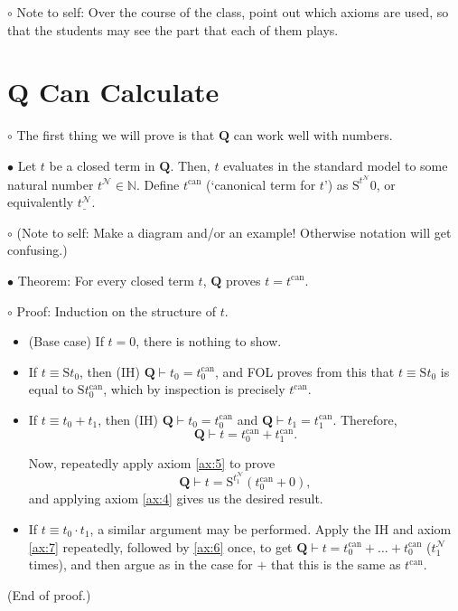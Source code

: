 \documentclass{article}
\newcommand{\N}{\mathbb{N}}
\newcommand{\RQ}{\mathbf{Q}}
\newcommand{\TN}{\mathcal{N}}
\newcommand{\suc}{\mathrm{S}}
\newcommand{\can}{\mathrm{can}}
\newcommand\Point[1]{\noindent \hspace{\labelsep} {\large $\bullet$ #1} \smallskip}
\newcommand\point[1]{\noindent \hspace{\labelsep} {\small $\circ$ #1} \smallskip}
\newcommand\timestamp[1]{}
\newcommand\proofend{\hfill(End of proof.)}
\begin{document}
\point{Note to self: Over the course of the class, point out which axioms are used, so that the students may see the part that each of them plays.}

\timestamp{5 min}

\section{$\RQ$ Can Calculate}

\point{The first thing we will prove is that $\RQ$ can work well with numbers.}

\Point{Let $t$ be a closed term in $\RQ$. Then, $t$ evaluates in the standard model to some natural number $t^\TN \in \N$. Define $t^\can$ (`canonical term for $t$') as $\suc^{t^\TN}0$, or equivalently $\underline{t^\TN}$.}

\point{(Note to self: Make a diagram and/or an example! Otherwise notation will get confusing.)}

\Point{Theorem: For every closed term $t$, $\RQ$ proves $t = t^\can$.}

\point{Proof: Induction on the structure of $t$.
\begin{itemize}
\item (Base case) If $t = 0$, there is nothing to show.
\item If $t \equiv \suc t_0$, then (IH) $\RQ \vdash t_0 = t_0^\can$, and FOL proves from this that $t \equiv \suc t_0$ is equal to $\suc t_0^\can$, which by inspection is precisely $t^\can$.
\item If $t \equiv t_0 + t_1$, then (IH) $\RQ \vdash t_0 = t_0^\can$ and $\RQ \vdash t_1 = t_1^\can$. Therefore,
\begin{equation}
\RQ \vdash t = t_0^\can + t_1^\can.
\end{equation} 

Now, repeatedly apply axiom \ref{ax:5} to prove
\begin{equation}
\RQ \vdash t = \suc^{t_1^\TN}(t_0^\can + 0),
\end{equation}
and applying axiom \ref{ax:4} gives us the desired result.
\item If $t \equiv t_0 \cdot t_1$, a similar argument may be performed. Apply the IH and axiom \ref{ax:7} repeatedly, followed by \ref{ax:6} once, to get $\RQ \vdash t = t_0^\can + \dots + t_0^\can$ ($t_1^\TN$ times), and then argue as in the case for $+$ that this is the same as $t^\can$.
\end{itemize}
\proofend}

\timestamp{15 min}
\end{document}
